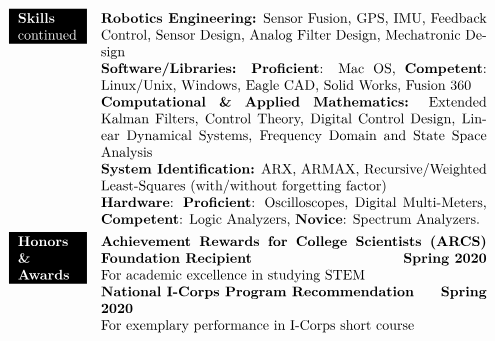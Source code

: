 \documentclass[paper=a4,fontsize=11pt]{article} %
\def \mainColWidth {0.8\textwidth}		%
\def \leftColWidth {0.125\textwidth}		%
\begin{document}
\begin{align*}
{%
	}%
\\
	\colorbox{black}{\color{white}{
			\parbox[t]{\leftColWidth}{%
				\textbf{Skills} continued}
		}%
	}
	& & 
	\parbox[t]{\mainColWidth}{%
		\textbf{Robotics Engineering:} Sensor Fusion, GPS, IMU, Feedback Control, Sensor Design, Analog Filter Design, Mechatronic Design\\
		\textbf{Software/Libraries:} \textbf{Proficient}: Mac OS, \textbf{Competent}: Linux/Unix, Windows, Eagle CAD, Solid Works, Fusion 360\\
		\textbf{Computational \& Applied Mathematics:} Extended Kalman Filters, Control Theory, Digital Control Design, Linear Dynamical Systems, Frequency Domain and State Space Analysis\\
		\textbf{System Identification:} ARX, ARMAX, Recursive/Weighted Least-Squares (with/without forgetting factor)\\
		\textbf{Hardware}: \textbf{Proficient}: Oscilloscopes, Digital Multi-Meters, \textbf{Competent}: Logic Analyzers, \textbf{Novice}: Spectrum Analyzers.
}%
\\
\colorbox{black}{\color{white}{
		\parbox[t]{\leftColWidth}{%
			\textbf{Honors \& Awards}}
	}%
}
& &
\parbox[t]{\mainColWidth}{%
	\textbf{Achievement Rewards for College Scientists (ARCS) Foundation Recipient}  \hfill \textbf{Spring 2020}\\
	\quad For academic excellence in studying STEM\\
	\textbf{National I-Corps Program Recommendation}  \hfill \textbf{Spring 2020}\\
	\quad For exemplary performance in I-Corps short course
}
\end{align*}
\end{document}

